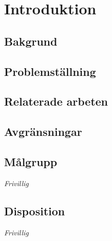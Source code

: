 \chapter{Introduktion}

\lipsum[1]

\section{Bakgrund}

\lipsum[2-3]

\section{Problemställning}

\lipsum[5]

\section{Relaterade arbeten}

\lipsum[6]

\section{Avgränsningar}

\lipsum[7]

\section{Målgrupp}

\emph{Frivillig}

\lipsum[8]

\section{Disposition}

\emph{Frivillig}

\lipsum[9]